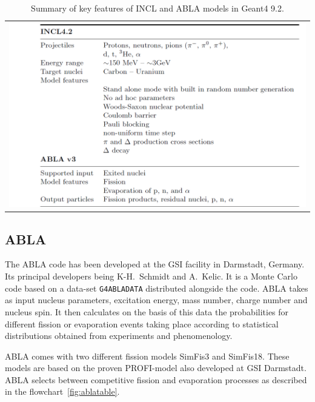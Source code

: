 \begin{center}
\begin{table}[!h]
\begin{tabular}{l}
\includegraphics[width=1\textwidth]{images/inclSummary.png}
\end{tabular}
\caption{\label{fig:inclpotential} Summary of key features of INCL and ABLA models in Geant4 9.2.}
\end{table}
\end{center}

\subsection{ABLA}

The ABLA code has been developed at the GSI facility in Darmstadt, Germany. Its principal developers being K-H.~Schmidt and A.~Kelic. It is a Monte Carlo code based on a data-set {\tt G4ABLADATA} distributed alongside the code. ABLA takes as input nucleus parameters, excitation energy, mass number, charge number and nucleus spin. It then calculates on the basis of this data the probabilities for different fission or evaporation events taking place according to statistical distributions obtained from experiments and phenomenology.

ABLA comes with two different fission models SimFis3 and SimFis18. These models are based on the proven PROFI-model also developed at GSI Darmstadt. ABLA selects between competitive fission and evaporation processes as described in the flowchart~\ref{fig:ablatable}.

